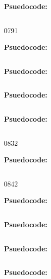 \textbf{Psuedocode:}
\begin{verbatim}
\end{verbatim}


   {079}{1}

\textbf{Psuedocode:}
\begin{verbatim}
\end{verbatim}



\textbf{Psuedocode:}
\begin{verbatim}
\end{verbatim}



\textbf{Psuedocode:}
\begin{verbatim}
\end{verbatim}



\textbf{Psuedocode:}
\begin{verbatim}
\end{verbatim}


  {083}{2}

\textbf{Psuedocode:}
\begin{verbatim}
\end{verbatim}


      {084}{2}

\textbf{Psuedocode:}
\begin{verbatim}
\end{verbatim}



\textbf{Psuedocode:}
\begin{verbatim}
\end{verbatim}



\textbf{Psuedocode:}
\begin{verbatim}
\end{verbatim}



\textbf{Psuedocode:}
\begin{verbatim}
\end{verbatim}



